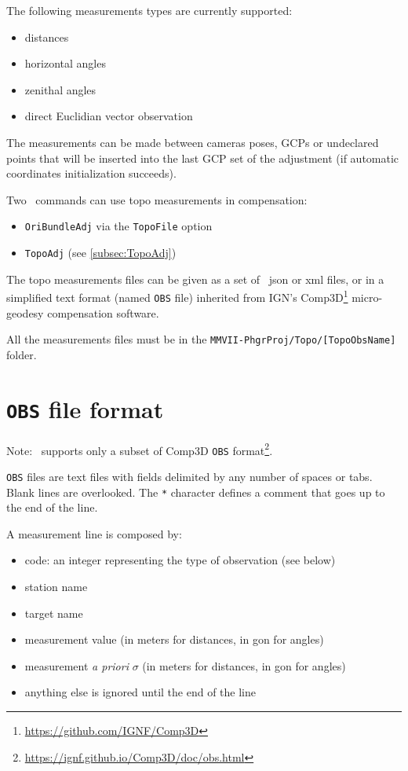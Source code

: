 The following measurements types are currently supported:

\begin{itemize}
    \item distances
    \item horizontal angles
    \item zenithal angles
    \item direct Euclidian vector observation
\end{itemize}

The measurements can be made between cameras poses, GCPs or undeclared points that will be inserted into the last GCP set of the adjustment
(if automatic coordinates initialization succeeds).

Two \CdPPP\ commands can use topo measurements in compensation:
\begin{itemize}
    \item \texttt{OriBundleAdj} via the \texttt{TopoFile} option
    \item \texttt{TopoAdj} (see \ref{subsec:TopoAdj})
\end{itemize}

The topo measurements files can be given as a set of \CdPPP\ json or xml files, or in a simplified text format (named \texttt{OBS} file) inherited from IGN's
Comp3D\footnote{\url{https://github.com/IGNF/Comp3D}} micro-geodesy compensation software.

All the measurements files must be in the \texttt{MMVII-PhgrProj/Topo/[TopoObsName]} folder.

\section{\texttt{OBS} file format}
\label{sec:compObsFormat}

Note: \CdPPP\ supports only a subset of Comp3D \texttt{OBS} format\footnote{\url{https://ignf.github.io/Comp3D/doc/obs.html}}.

\texttt{OBS} files are text files with fields delimited by any number of spaces or tabs. Blank lines are overlooked.
The \texttt{*} character defines a comment that goes up to the end of the line.

A measurement line is composed by:

\begin{itemize}
    \item code: an integer representing the type of observation (see below)
    \item station name
    \item target name
    \item measurement value (in meters for distances, in gon for angles)
    \item measurement \textit{a priori} $\sigma$ (in meters for distances, in gon for angles)
    \item anything else is ignored until the end of the line
\end{itemize}

